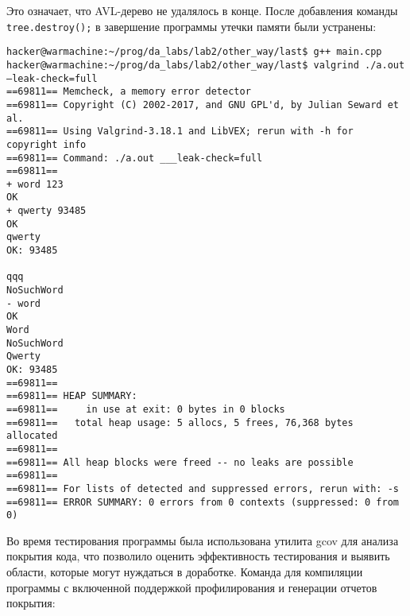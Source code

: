 \documentclass[12pt]{article}
\begin{document}
Это означает, что AVL-дерево не удалялось в конце. После добавления команды \texttt{tree.destroy();} в завершение программы утечки памяти были устранены:
\begin{lstlisting}
hacker@warmachine:~/prog/da_labs/lab2/other_way/last$ g++ main.cpp
hacker@warmachine:~/prog/da_labs/lab2/other_way/last$ valgrind ./a.out –leak-check=full
==69811== Memcheck, a memory error detector
==69811== Copyright (C) 2002-2017, and GNU GPL'd, by Julian Seward et al.
==69811== Using Valgrind-3.18.1 and LibVEX; rerun with -h for copyright info
==69811== Command: ./a.out ___leak-check=full
==69811==
+ word 123
OK
+ qwerty 93485
OK
qwerty
OK: 93485

qqq
NoSuchWord
- word
OK
Word
NoSuchWord
Qwerty
OK: 93485
==69811==
==69811== HEAP SUMMARY:
==69811==     in use at exit: 0 bytes in 0 blocks
==69811==   total heap usage: 5 allocs, 5 frees, 76,368 bytes allocated
==69811==
==69811== All heap blocks were freed -- no leaks are possible
==69811==
==69811== For lists of detected and suppressed errors, rerun with: -s
==69811== ERROR SUMMARY: 0 errors from 0 contexts (suppressed: 0 from 0)
\end{lstlisting}
Во время тестирования программы была использована утилита gcov для анализа покрытия кода, что позволило оценить эффективность тестирования и выявить области, которые могут нуждаться в доработке.
Команда для компиляции программы с включенной поддержкой профилирования и генерации отчетов покрытия:
\end{document}
